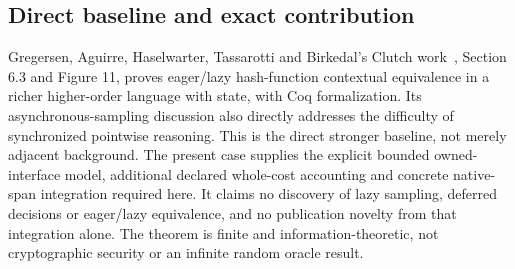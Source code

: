 \subsection{Direct baseline and exact contribution}
Gregersen, Aguirre, Haselwarter, Tassarotti and Birkedal's
Clutch work~\cite{Clutch}, Section 6.3 and Figure 11, proves eager/lazy
hash-function contextual equivalence in a richer higher-order language
with state, with Coq formalization. Its asynchronous-sampling discussion
also directly addresses the difficulty of synchronized pointwise reasoning.
This is the direct stronger baseline, not merely adjacent background.
The present case supplies the explicit bounded owned-interface model,
additional declared whole-cost accounting and concrete native-span
integration required here. It claims no discovery of lazy sampling,
deferred decisions or eager/lazy equivalence, and no publication novelty
from that integration alone. The theorem is finite and
information-theoretic, not cryptographic security or an infinite random
oracle result.

